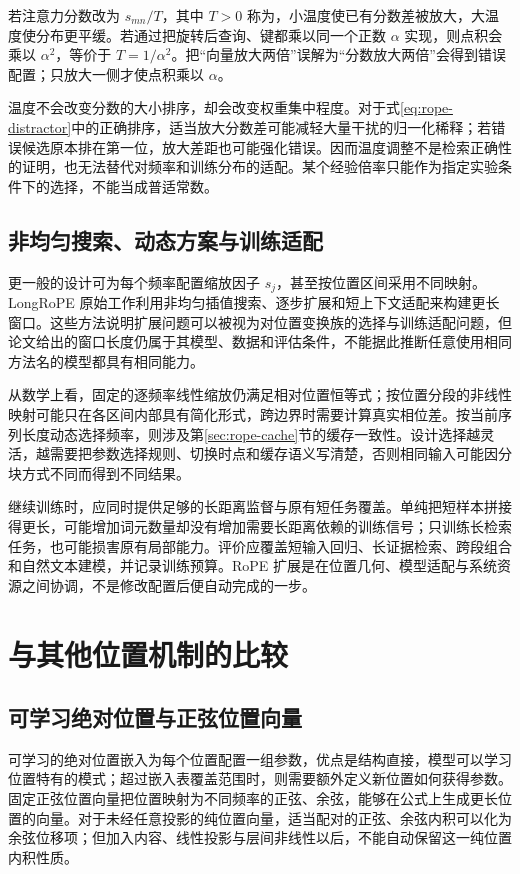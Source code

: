 \documentclass[UTF8,12pt,a4paper,fontset=fandol]{ctexart}
\begin{document}
若注意力分数改为 $s_{mn}/T$，其中 $T>0$ 称为，小温度使已有分数差被放大，大温度使分布更平缓。若通过把旋转后查询、键都乘以同一个正数 $\alpha$ 实现，则点积会乘以 $\alpha^2$，等价于 $T=1/\alpha^2$。把“向量放大两倍”误解为“分数放大两倍”会得到错误配置；只放大一侧才使点积乘以 $\alpha$。

温度不会改变分数的大小排序，却会改变权重集中程度。对于式\eqref{eq:rope-distractor}中的正确排序，适当放大分数差可能减轻大量干扰的归一化稀释；若错误候选原本排在第一位，放大差距也可能强化错误。因而温度调整不是检索正确性的证明，也无法替代对频率和训练分布的适配。某个经验倍率只能作为指定实验条件下的选择，不能当成普适常数。

\subsection{非均匀搜索、动态方案与训练适配}
更一般的设计可为每个频率配置缩放因子 $s_j$，甚至按位置区间采用不同映射。LongRoPE 原始工作利用非均匀插值搜索、逐步扩展和短上下文适配来构建更长窗口\cite{ding2024}。这些方法说明扩展问题可以被视为对位置变换族的选择与训练适配问题，但论文给出的窗口长度仍属于其模型、数据和评估条件，不能据此推断任意使用相同方法名的模型都具有相同能力。

从数学上看，固定的逐频率线性缩放仍满足相对位置恒等式；按位置分段的非线性映射可能只在各区间内部具有简化形式，跨边界时需要计算真实相位差。按当前序列长度动态选择频率，则涉及第\ref{sec:rope-cache}节的缓存一致性。设计选择越灵活，越需要把参数选择规则、切换时点和缓存语义写清楚，否则相同输入可能因分块方式不同而得到不同结果。

继续训练时，应同时提供足够的长距离监督与原有短任务覆盖。单纯把短样本拼接得更长，可能增加词元数量却没有增加需要长距离依赖的训练信号；只训练长检索任务，也可能损害原有局部能力。评价应覆盖短输入回归、长证据检索、跨段组合和自然文本建模，并记录训练预算。RoPE 扩展是在位置几何、模型适配与系统资源之间协调，不是修改配置后便自动完成的一步。

\section{与其他位置机制的比较}
\label{sec:rope-comparison}

\subsection{可学习绝对位置与正弦位置向量}
可学习的绝对位置嵌入为每个位置配置一组参数，优点是结构直接，模型可以学习位置特有的模式；超过嵌入表覆盖范围时，则需要额外定义新位置如何获得参数。固定正弦位置向量把位置映射为不同频率的正弦、余弦，能够在公式上生成更长位置的向量。对于未经任意投影的纯位置向量，适当配对的正弦、余弦内积可以化为余弦位移项；但加入内容、线性投影与层间非线性以后，不能自动保留这一纯位置内积性质。
\end{document}
